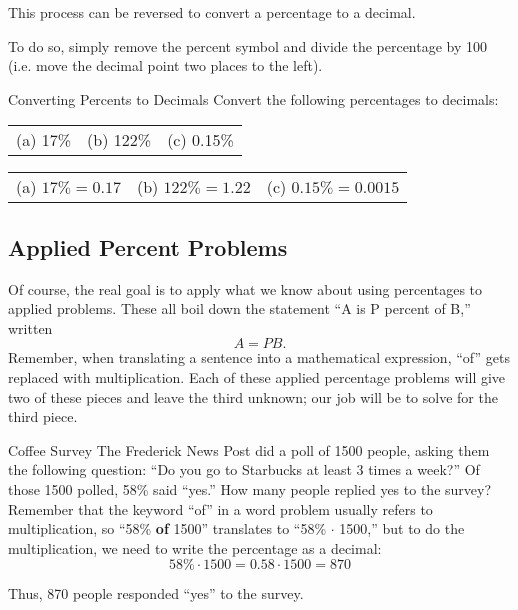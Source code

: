 This process can be reversed to convert a percentage to a decimal.

To do so, simply remove the percent symbol and divide the percentage by 100 (i.e. move the decimal point two places to the left).

\begin{example}[https://www.youtube.com/watch?v=d770dB9RHIc]{Converting Percents to Decimals}
Convert the following percentages to decimals:\\

\begin{tabular}{l l l}
(a) 17\% & (b) 122\% & (c) 0.15\%
\end{tabular}

\begin{center}
\begin{tabular}{l l l}
(a) $17\% = 0.17$ & (b) $122\% = 1.22$ & (c) $0.15\% = 0.0015$
\end{tabular}
\end{center}
\end{example}
\vfill
\pagebreak

\subsection{Applied Percent Problems}
Of course, the real goal is to apply what we know about using percentages to applied problems.  These all boil down the statement ``A is P percent of B,'' written \[A = PB.\]  Remember, when translating a sentence into a mathematical expression, ``of'' gets replaced with multiplication.  Each of these applied percentage problems will give two of these pieces and leave the third unknown; our job will be to solve for the third piece.

\begin{example}[https://www.youtube.com/watch?v=8VSRt2PMqJI]{Coffee Survey}
The Frederick News Post did a poll of 1500 people, asking them the following question: ``Do you go to Starbucks at least 3 times a week?'' Of those 1500 polled, 58\% said ``yes.''  How many people replied yes to the survey?\\

Remember that the keyword ``of'' in a word problem usually refers to multiplication, so ``58\% \textbf{of} 1500'' translates to ``58\% $\cdot$ 1500,'' but to do the multiplication, we need to write the percentage as a decimal:
\[58\% \cdot 1500 = 0.58 \cdot 1500 = 870\]

Thus, 870 people responded ``yes'' to the survey.
\end{example}

